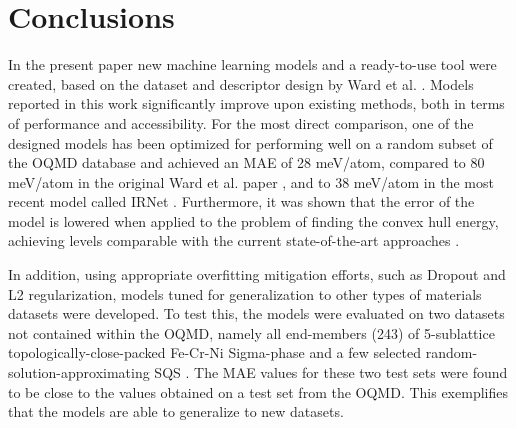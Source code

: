 \section{Conclusions} \label{sipfenn:ssec:Conclusions}
In the present paper new machine learning models and a ready-to-use tool were created, based on the dataset and descriptor design by Ward et al. \cite{Ward2017IncludingTessellations}. Models reported in this work significantly improve upon existing methods, both in terms of performance and accessibility. For the most direct comparison, one of the designed models has been optimized for performing well on a random subset of the OQMD database and achieved an MAE of 28 meV/atom, compared to 80 meV/atom in the original  Ward et al. paper \cite{Ward2017IncludingTessellations}, and to 38 meV/atom in the most recent model called IRNet \cite{Jha2019IRNet}. Furthermore, it was shown that the error of the model is lowered when applied to the problem of finding the convex hull energy, achieving levels comparable with the current state-of-the-art approaches \cite{Jha2018ElemNet:Composition, Goodall2020PredictingStoichiometry}.

In addition, using appropriate overfitting mitigation efforts, such as Dropout and L2 regularization, models tuned for generalization to other types of materials datasets were developed. To test this, the models were evaluated on two datasets not contained within the OQMD, namely all end-members (243) of 5-sublattice topologically-close-packed Fe-Cr-Ni Sigma-phase \cite{Feurer2019Cr-Fe-NiCalculations, Hsieh2012OverviewSteels} and a few selected random-solution-approximating SQS \cite{Zunger1990SpecialStructures, Shin2006ThermodynamicStructures, Jiang2004First-principlesStructures}. The MAE values for these two test sets were found to be close to the values obtained on a test set from the OQMD. This exemplifies that the models are able to generalize to new datasets.

